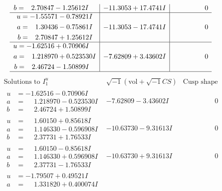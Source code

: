 \documentclass[1p]{elsarticle_modified}
\theoremstyle{definition}
\newcommand{\I}{\sqrt{-1}}
\begin{document}
$$\begin{array}{c|c|c}
\begin{aligned}
b &= \phantom{-}2.70847 - 1.25612 I\end{aligned}
 & -11.3053 + 17.4741 I & \phantom{-0.000000 } 0 \\ \hline\begin{aligned}
u &= -1.55571 - 0.78921 I \\
a &= \phantom{-}1.30436 - 0.75861 I \\
b &= \phantom{-}2.70847 + 1.25612 I\end{aligned}
 & -11.3053 - 17.4741 I & \phantom{-0.000000 } 0 \\ \hline\begin{aligned}
u &= -1.62516 + 0.70906 I \\
a &= \phantom{-}1.218970 + 0.523530 I \\
b &= \phantom{-}2.46724 - 1.50899 I\end{aligned}
 & -7.62809 + 3.43602 I & \phantom{-0.000000 } 0\\
 \hline 
 \end{array}$$\newpage$$\begin{array}{c|c|c}  
\text{Solutions to }I^u_{1}& \I (\text{vol} + \sqrt{-1}CS) & \text{Cusp shape}\\
 \hline 
\begin{aligned}
u &= -1.62516 - 0.70906 I \\
a &= \phantom{-}1.218970 - 0.523530 I \\
b &= \phantom{-}2.46724 + 1.50899 I\end{aligned}
 & -7.62809 - 3.43602 I & \phantom{-0.000000 } 0 \\ \hline\begin{aligned}
u &= \phantom{-}1.60150 + 0.85618 I \\
a &= \phantom{-}1.146330 - 0.596908 I \\
b &= \phantom{-}2.37731 + 1.76533 I\end{aligned}
 & -10.63730 - 9.31613 I & \phantom{-0.000000 } 0 \\ \hline\begin{aligned}
u &= \phantom{-}1.60150 - 0.85618 I \\
a &= \phantom{-}1.146330 + 0.596908 I \\
b &= \phantom{-}2.37731 - 1.76533 I\end{aligned}
 & -10.63730 + 9.31613 I & \phantom{-0.000000 } 0 \\ \hline\begin{aligned}
u &= -1.79507 + 0.49521 I \\
a &= \phantom{-}1.331820 + 0.400074 I \\

\end{aligned}
\end{array}$$
\end{document}
